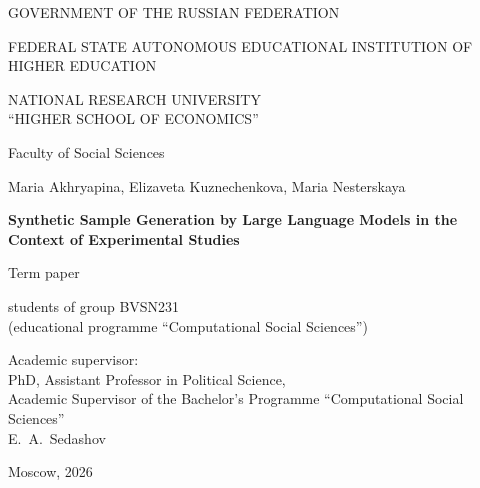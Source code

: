 \documentclass[14pt,a4paper]{extarticle}
\newcommand{\snakebreak}{\renewcommand{\_}{\textunderscore\allowbreak}}
\begin{document}
\snakebreak

\begin{titlepage}

\begin{center}
GOVERNMENT OF THE RUSSIAN FEDERATION

\medskip
FEDERAL STATE AUTONOMOUS EDUCATIONAL INSTITUTION OF HIGHER EDUCATION

\medskip
NATIONAL RESEARCH UNIVERSITY \\ ``HIGHER SCHOOL OF ECONOMICS''
\end{center}

\vspace{0.9cm}
\begin{center}
Faculty of Social Sciences
\end{center}

\vspace{2.6cm}
\begin{center}
Maria Akhryapina, Elizaveta Kuznechenkova, Maria Nesterskaya

\vspace{0.5cm}
{\large\bfseries Synthetic Sample Generation by Large Language Models in the Context of Experimental Studies}

\vspace{0.5cm}
Term paper

\vspace{0.3cm}
students of group BVSN231 \\ (educational programme ``Computational Social Sciences'')
\end{center}

\vspace{1.8cm}
\begin{flushright}
\begin{minipage}{0.62\textwidth}
\raggedright
Academic supervisor:\\
PhD, Assistant Professor in Political Science,\\
Academic Supervisor of the Bachelor's Programme ``Computational Social Sciences''\\[0.35cm]
E.~A.~Sedashov
\end{minipage}
\end{flushright}

\vfill
\begin{center}
Moscow, 2026
\end{center}

\end{titlepage}


\end{document}
